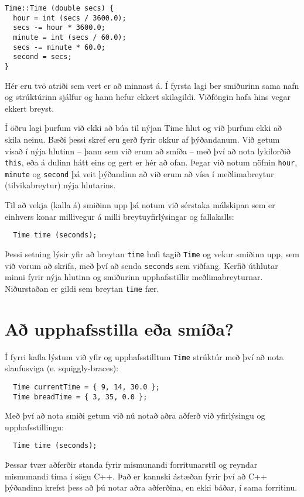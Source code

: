 \begin{verbatim}
Time::Time (double secs) {
  hour = int (secs / 3600.0);
  secs -= hour * 3600.0;
  minute = int (secs / 60.0);
  secs -= minute * 60.0;
  second = secs;
}
\end{verbatim}
%
Hér eru tvö atriði sem vert er að minnast á.
Í fyrsta lagi ber smiðurinn sama nafn og strúktúrinn sjálfur og hann hefur ekkert skilagildi.
Viðföngin hafa hins vegar ekkert breyst.

Í öðru lagi þurfum við ekki að búa til nýjan Time hlut og við þurfum ekki að skila neinu.
Bæði þessi skref eru gerð fyrir okkur af þýðandanum.
Við getum vísað í nýja hlutinn -- þann sem við erum að smíða -- með því að nota lykilorðið
{\tt this}, eða á dulinn hátt eins og gert er hér að ofan. 
Þegar við notum nöfnin {\tt hour}, {\tt minute}
og {\tt second} þá veit þýðandinn að við erum að vísa í meðlimabreytur (tilvikabreytur) nýja hlutarins. 

Til að vekja (kalla á) smiðinn upp þá notum við sérstaka málskipan sem er einhvers konar millivegur á milli breytuyfirlýsingar og fallakalls:

\begin{verbatim}
  Time time (seconds);
\end{verbatim}
%
Þessi setning lýsir yfir að breytan {\tt time} hafi tagið {\tt Time} og vekur smiðinn upp, sem við vorum að skrifa, 
með því að senda {\tt seconds} sem viðfang.
Kerfið úthlutar minni fyrir nýja hlutinn og smiðurinn upphafsstillir meðlimabreyturnar.
Niðurstaðan er gildi sem breytan {\tt time} fær.


\section {Að upphafsstilla eða smíða?}

Í fyrri kafla lýstum við yfir og upphafsstilltum {\tt Time} strúktúr með því að nota slaufusviga (e. squiggly-braces):

\begin{verbatim}
  Time currentTime = { 9, 14, 30.0 };
  Time breadTime = { 3, 35, 0.0 };
\end{verbatim}
%
Með því að nota smiði getum við nú notað aðra aðferð við yfirlýsingu og upphafsstillingu:

\begin{verbatim}
  Time time (seconds);
\end{verbatim}
%
Þessar tvær aðferðir standa fyrir mismunandi forritunarstíl og reyndar mismunandi tíma í sögu C++.
Það er kannski ástæðan fyrir því að C++ þýðandinn krefst þess að þú notar aðra aðferðina, en ekki báðar, í sama forritinu.


